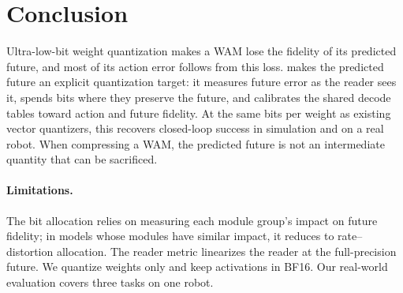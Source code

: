 \section{Conclusion}
\label{sec:conclusion}

Ultra-low-bit weight quantization makes a WAM lose the fidelity of its predicted future, and most of its action error follows from this loss.
\method makes the predicted future an explicit quantization target: it measures future error as the reader sees it, spends bits where they preserve the future, and calibrates the shared decode tables toward action and future fidelity.
At the same bits per weight as existing vector quantizers, this recovers closed-loop success in simulation and on a real robot.
When compressing a WAM, the predicted future is not an intermediate quantity that can be sacrificed.

\paragraph{Limitations.}
The bit allocation relies on measuring each module group's impact on future fidelity; in models whose modules have similar impact, it reduces to rate--distortion allocation.
The reader metric linearizes the reader at the full-precision future.
We quantize weights only and keep activations in BF16.
Our real-world evaluation covers three tasks on one robot.

